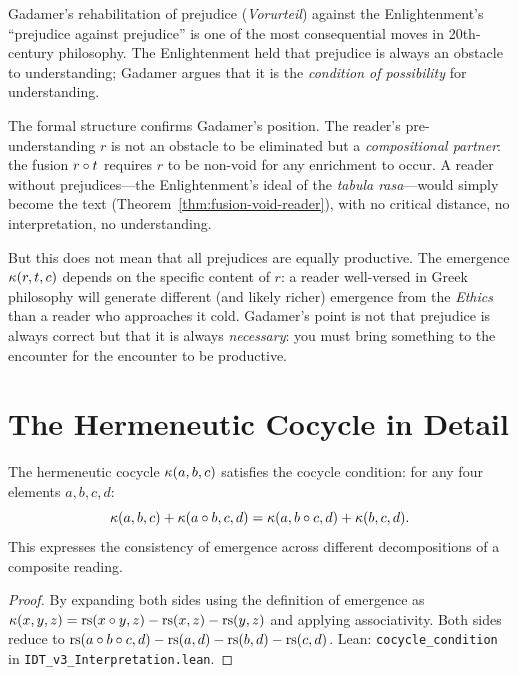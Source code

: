 \begin{interpretation}
\label{interp:prejudice-rehab}
Gadamer's rehabilitation of prejudice (\textit{Vorurteil}) against the
Enlightenment's ``prejudice against prejudice'' is one of the most
consequential moves in 20th-century philosophy.  The Enlightenment held
that prejudice is always an obstacle to understanding; Gadamer argues that
it is the \emph{condition of possibility} for understanding.

The formal structure confirms Gadamer's position.  The reader's pre-understanding
$r$ is not an obstacle to be eliminated but a \emph{compositional partner}:
the fusion $r \circ t$ requires $r$ to be non-void for any enrichment
to occur.  A reader without prejudices---the Enlightenment's ideal of the
\textit{tabula rasa}---would simply become the text
(Theorem~\ref{thm:fusion-void-reader}), with no critical distance, no
interpretation, no understanding.

But this does not mean that all prejudices are equally productive.
The emergence $\kappa(r, t, c)$ depends on the specific content of $r$:
a reader well-versed in Greek philosophy will generate different (and
likely richer) emergence from the \textit{Ethics} than a reader who
approaches it cold.  Gadamer's point is not that prejudice is always
correct but that it is always \emph{necessary}: you must bring something
to the encounter for the encounter to be productive.
\end{interpretation}

\section{The Hermeneutic Cocycle in Detail}

\begin{theorem}
\label{thm:cocycle-naturality}
The hermeneutic cocycle $\kappa(a, b, c)$ satisfies the cocycle condition:
for any four elements $a, b, c, d$:
\[
\kappa(a, b, c) + \kappa(a \circ b, c, d) = \kappa(a, b \circ c, d) + \kappa(b, c, d).
\]
This expresses the consistency of emergence across different decompositions
of a composite reading.
\end{theorem}

\begin{proof}
By expanding both sides using the definition of emergence as
$\kappa(x, y, z) = \mathrm{rs}(x \circ y, z) - \mathrm{rs}(x, z) - \mathrm{rs}(y, z)$
and applying associativity.  Both sides reduce to
$\mathrm{rs}(a \circ b \circ c, d) - \mathrm{rs}(a, d) - \mathrm{rs}(b, d) - \mathrm{rs}(c, d)$.
Lean: \texttt{cocycle\_condition} in \texttt{IDT\_v3\_Interpretation.lean}.
\end{proof}

